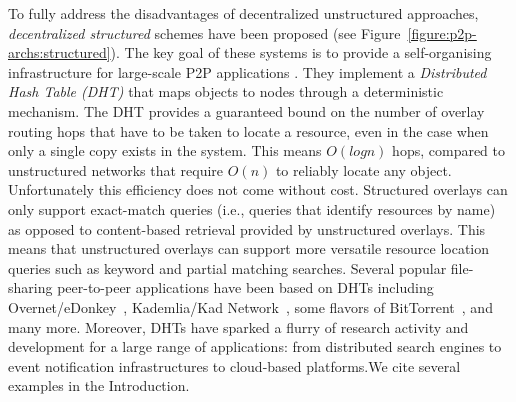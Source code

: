 To fully address the disadvantages of decentralized unstructured approaches,
\emph{decentralized structured} schemes have been proposed (see
Figure~\ref{figure:p2p-archs:structured}). The key goal of these systems is to
provide a self-organising infrastructure for large-scale P2P applications
\cite{ratnasamy_can_2001,stoica_chord_2001,antony_pastry_2001,zhao_tapestry_2001,maymounkov_kademlia_2002,rgrk_bamboo_2004}.
They implement a \emph{Distributed Hash Table (DHT)} that maps objects to nodes
through a deterministic mechanism. The DHT provides a guaranteed bound on the
number of overlay routing hops that have to be taken to locate a resource, even
in the case when only a single copy exists in the system.  This means
$O \left( log n \right)$ hops, compared to unstructured networks that require
$O \left( n \right)$ to reliably locate any object. Unfortunately this
efficiency does not come without cost. Structured overlays can only support
exact-match queries (i.e., queries that identify resources by name) as opposed
to content-based retrieval provided by unstructured overlays. This means
that unstructured overlays can support more versatile resource location queries
such as keyword and partial matching searches. Several popular file-sharing
peer-to-peer applications have been based on DHTs including
Overnet/eDonkey~\cite{overnet}, Kademlia/Kad
Network~\cite{maymounkov_kademlia_2002}, some flavors of
BitTorrent~\cite{c_bittorrent_2003}, and many more.  Moreover, DHTs have sparked
a flurry of research activity and development for a large range of applications:
from distributed search engines to event notification infrastructures to
cloud-based platforms.We cite several examples in the Introduction.

